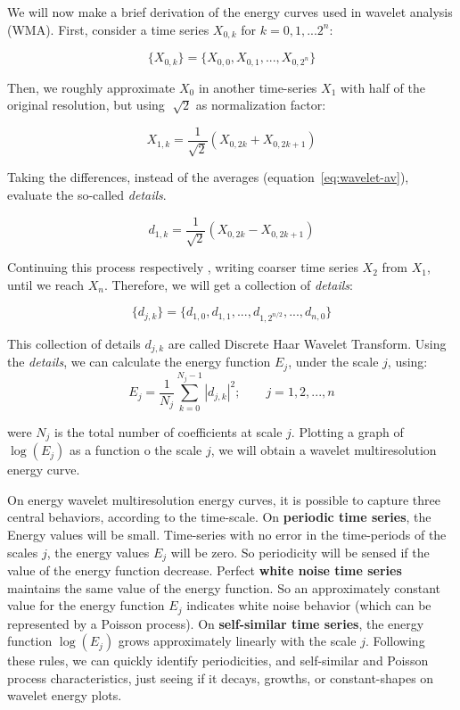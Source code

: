 We will now make a brief derivation of the energy curves used in wavelet analysis (WMA). First, consider a time series $X_{0,k}$ for $k = 0, 1, ... 2^n$:

\begin{equation}
\{X_{0,k}\} = \{ X_{0,0}, X_{0,1}, ... ,X_{0,2^{n}} \}
\end{equation} 

\noindent Then, we roughly approximate $X_ {0} $ in another time-series $X_ {1} $ with half of the original resolution, but using $ \sqrt[]{2} $ as normalization factor:

\begin{equation}
\label{eq:wavelet-av}
X_{1,k} = \frac{1}{\sqrt{2}}(X_{0,2k} + X_{0,2k+1})
\end{equation}

\noindent Taking the differences, instead of the averages (equation~\ref{eq:wavelet-av}), evaluate the so-called \textit{details}.

\begin{equation}
d_{1,k} = \frac{1}{\sqrt{2}}(X_{0,2k} - X_{0,2k+1})
\end{equation}

\noindent  Continuing this process respectively , writing coarser time series $X_{2}$ from $X_{1}$, until we reach $X_{n}$. Therefore, we will get a collection of \textit{details}:

\begin{equation}
\{d_{j,k}\} = \{ d_{1,0}, d_{1,1}, ..., d_{1,2^{n/2}}, ..., d_{n, 0} \}
\end{equation}

\noindent  This collection of details ${d_{j,k}}$ are called Discrete Haar Wavelet Transform. Using the \textit{details}, we can calculate the energy function $E_{j}$, under the scale $j$, using:
\begin{equation}
E_{j} = \frac{1}{N_{j}} \sum_{k = 0}^{N_{j} - 1} |d_{j,k}|^{2}; \qquad j = 1, 2, ..., n
\end{equation} 

\noindent  were $N_{j}$ is the total number of coefficients at scale $j$. Plotting a graph of $\log(E_{j})$ as a function o the scale $j$, we will obtain a wavelet multiresolution energy curve.

On energy wavelet multiresolution energy curves, it is possible to capture three central behaviors, according to the time-scale.  On \textbf{periodic time series}, the Energy values will be small. Time-series with no error in the time-periods of the scales $j$, the energy values $E_{j}$ will be zero. So periodicity will be sensed if the value of the energy function decrease. Perfect \textbf{white noise time series} maintains the same value of the energy function. So an approximately constant value for the energy function $E_{j}$ indicates white noise behavior (which can be represented by a Poisson process\cite{poisson-white-noise}). On \textbf{self-similar time series}, the energy function  $\log(E_{j})$ grows approximately linearly with the scale $j$. Following these rules, we can quickly identify periodicities, and self-similar and Poisson process characteristics, just seeing if it decays, growths, or constant-shapes on wavelet energy plots.

